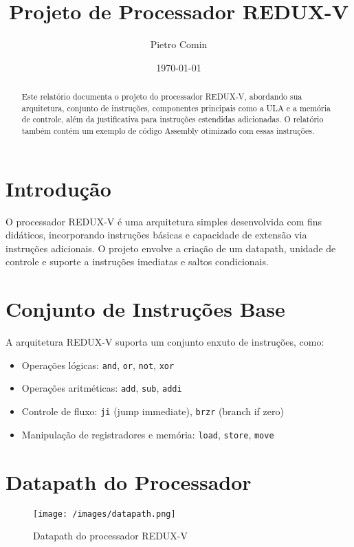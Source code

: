 \documentclass[12pt]{article}
\title{Projeto de Processador REDUX-V}
\author{Pietro Comin}
\date{\today}
\begin{document}
\maketitle

\begin{abstract}
Este relatório documenta o projeto do processador REDUX-V, abordando sua arquitetura, conjunto de instruções, componentes principais como a ULA e a memória de controle, além da justificativa para instruções estendidas adicionadas. O relatório também contém um exemplo de código Assembly otimizado com essas instruções.
\end{abstract}

\section{Introdução}

O processador REDUX-V é uma arquitetura simples desenvolvida com fins didáticos, incorporando instruções básicas e capacidade de extensão via instruções adicionais. O projeto envolve a criação de um datapath, unidade de controle e suporte a instruções imediatas e saltos condicionais.

\section{Conjunto de Instruções Base}

A arquitetura REDUX-V suporta um conjunto enxuto de instruções, como:

\begin{itemize}
  \item Operações lógicas: \texttt{and}, \texttt{or}, \texttt{not}, \texttt{xor}
  \item Operações aritméticas: \texttt{add}, \texttt{sub}, \texttt{addi}
  \item Controle de fluxo: \texttt{ji} (jump immediate), \texttt{brzr} (branch if zero)
  \item Manipulação de registradores e memória: \texttt{load}, \texttt{store}, \texttt{move}
\end{itemize}

\section{Datapath do Processador}

\begin{figure}[h!]
\centering
\texttt{[image: /images/datapath.png]}
\caption{Datapath do processador REDUX-V}
\label{fig:datapath}
\end{figure}
\end{document}
